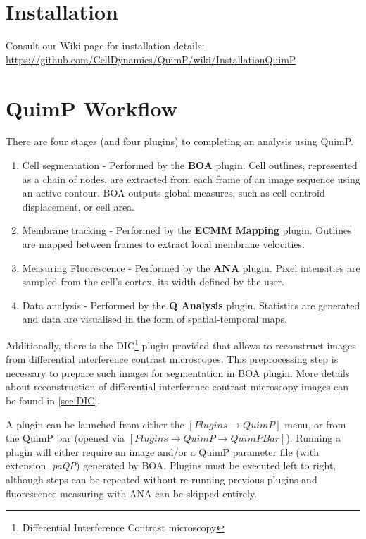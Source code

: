 \documentclass[a4paper,12pt]{article}
\begin{document}
\section{Installation}

Consult our Wiki page for installation details: \url{https://github.com/CellDynamics/QuimP/wiki/InstallationQuimP}


\section{QuimP Workflow}

There are four stages (and four plugins) to completing an analysis using QuimP.

\begin{enumerate}
	\item Cell segmentation - Performed by the \textbf{BOA} plugin.  Cell outlines, represented as a chain of nodes, are extracted from each frame of an image sequence using an active contour. BOA outputs global measures, such as cell centroid displacement, or cell area.
	\item Membrane tracking - Performed by the \textbf{ECMM Mapping} plugin.  Outlines are mapped between frames to extract local membrane velocities.
	\item Measuring Fluorescence - Performed by the \textbf{ANA} plugin.  Pixel intensities are sampled from the cell's cortex, its width defined by the user.
	\item Data analysis - Performed by the \textbf{Q Analysis} plugin. Statistics are generated and data are visualised in the form of spatial-temporal maps.
\end{enumerate}

Additionally, there is the DIC\footnote{Differential Interference Contrast microscopy} plugin provided that allows to reconstruct images from differential interference contrast microscopes. This preprocessing step is necessary to prepare such images for segmentation in BOA plugin. More details about reconstruction of differential interference contrast microscopy images can be found in \autoref{sec:DIC}. 

A plugin can be launched from either the $[Plugins\rightarrow QuimP]$ menu, or from the QuimP bar
(opened via $[Plugins\rightarrow QuimP\rightarrow QuimP Bar]$).
Running a plugin will either require an image and/or a QuimP parameter file (with extension \textit{.paQP}) generated by BOA.
Plugins must be executed left to right, although steps can be repeated without re-running previous plugins and fluorescence
measuring with ANA can be skipped entirely.
\end{document}
